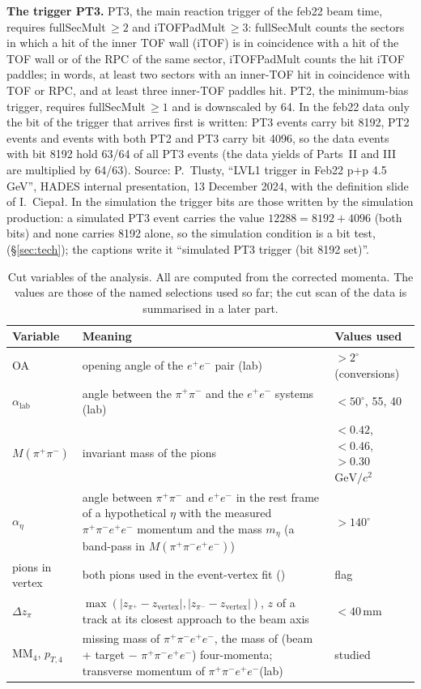 \documentclass[11pt,a4paper]{article}
\newcommand{\ee}{\ensuremath{e^{+}e^{-}}\xspace}
\newcommand{\pipi}{\ensuremath{\pi^{+}\pi^{-}}\xspace}
\newcommand{\ppee}{\ensuremath{\pi^{+}\pi^{-}e^{+}e^{-}}\xspace}
\newcommand{\Mfour}{\ensuremath{M(\pi^{+}\pi^{-}e^{+}e^{-})}\xspace}
\newcommand{\Mpipi}{\ensuremath{M(\pi^{+}\pi^{-})}\xspace}
\newcommand{\GeVcc}{\ensuremath{\mathrm{GeV}/c^{2}}\xspace}
\newcommand{\code}[1]{\texttt{\detokenize{#1}}}
\begin{document}
\textbf{The trigger PT3.} PT3, the main reaction trigger of the feb22 beam time, requires fullSecMult\,$\ge2$ and
iTOFPadMult\,$\ge3$: fullSecMult counts the sectors in which a hit of the inner TOF wall (iTOF) is in coincidence with a hit
of the TOF wall or of the RPC of the same sector, iTOFPadMult counts the hit iTOF paddles; in words, at least two sectors with
an inner-TOF hit in coincidence with TOF or RPC, and at least three inner-TOF paddles hit. PT2, the minimum-bias trigger,
requires fullSecMult\,$\ge1$ and is downscaled by 64. In the feb22 data only the bit of the trigger that arrives first is
written: PT3 events carry bit 8192, PT2 events and events with both PT2 and PT3 carry bit 4096, so the data events with bit 8192
hold 63/64 of all PT3 events (the data yields of Parts~II and III are multiplied by 64/63). Source: P.~Tlusty, ``LVL1 trigger
in Feb22 p+p 4.5\,GeV'', HADES internal presentation, 13 December 2024, with the definition slide of I.~Ciepa{\l}.
In the simulation the trigger bits are those written by the simulation production: a simulated PT3 event carries the value
$12288=8192+4096$ (both bits) and none carries 8192 alone, so the simulation condition is a bit test, \code{(trigbit & 8192) != 0}
(\S\ref{sec:tech}); the captions write it ``simulated PT3 trigger (bit 8192 set)''.

\begin{table}[H]
\centering
\caption{Cut variables of the analysis. All are computed from the corrected momenta.
The values are those of the named selections used so far; the cut scan of the data is
summarised in a later part.}
\label{tab:cuts}
\begin{tabularx}{\textwidth}{@{}l L l@{}}
\toprule
Variable & Meaning & Values used \\
\midrule
OA & opening angle of the \ee pair (lab) & $>2^\circ$ (conversions) \\
$\alpha_{\mathrm{lab}}$ & angle between the \pipi and the \ee systems (lab) & $<50^\circ$, 55, 40 \\
\Mpipi & invariant mass of the pions & $<0.42$, $<0.46$, $>0.30$\,\GeVcc \\
$\alpha_\eta$ & angle between \pipi and \ee in the rest frame of a hypothetical $\eta$ with the measured \ppee momentum and the mass $m_\eta$ (a band-pass in \Mfour) & $>140^\circ$ \\
pions in vertex & both pions used in the event-vertex fit (\code{isUsedVertex}) & flag \\
$\Delta z_\pi$ & $\max(|z_{\pi^+}-z_{\mathrm{vertex}}|, |z_{\pi^-}-z_{\mathrm{vertex}}|)$, $z$ of a track at its closest approach to the beam axis & $<40$\,mm \\
$\mathrm{MM}_4$, $p_{T,4}$ & missing mass of \ppee, the mass of (beam + target $-$ \ppee) four-momenta; transverse momentum of \ppee (lab) & studied \\
\bottomrule
\end{tabularx}
\end{table}
\end{document}
